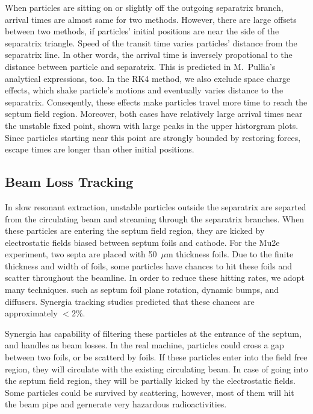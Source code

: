 \documentclass[aps,prstab,onecolumn,preprint,endfloats,11pt]{revtex4-1}
\begin{document}
When particles are sitting on or slightly off the outgoing separatrix branch, arrival times are almost same for two methods. However, there are large offsets between two methods, if particles' initial positions are near the side of the separatrix triangle. Speed of the transit time varies particles' distance from the separatrix line. In other words, the arrival time is inversely propotional to the distance between particle and separatrix. This is predicted in M.~Pullia's analytical expressions, too. In the RK4 method, we also exclude space charge effects, which shake particle's motions and eventually varies distance to the separatrix. Conseqently, these effects make particles travel more time to reach the septum field region. Moreover, both cases have relatively large arrival times near the unstable fixed point, shown with large peaks in the upper historgram plots. Since particles starting near this point are strongly bounded by restoring forces, escape times are longer than other initial positions. 



\clearpage
\subsection{\label{sec:beamloss}Beam Loss Tracking}

In slow resonant extraction, unstable particles outside the separatrix are separted from the circulating beam and streaming through the separatrix branches. When these particles are entering the septum field region, they are kicked by electrostatic fields biased between septum foils and cathode. For the Mu2e experiment, two septa are placed with 50~$\mu$m thickness foils. Due to the finite thickness and width of foils, some particles have chances to hit these foils and scatter throughout the beamline. In order to reduce these hitting rates, we adopt many techniques. such as septum foil plane rotation, dynamic bumps, and diffusers. Synergia tracking studies predicted that these chances are approximately $< 2 \%$. 

Synergia has capability of filtering these particles at the entrance of the septum, and handles as beam losses. In the real machine, particles could cross a gap between two foils, or be scatterd by foils. If these particles enter into the field free region, they will circulate with the existing circulating beam. In case of going into the septum field region, they will be partially kicked by the electrostatic fields. Some particles could be survived by scattering, however, most of them will hit the beam pipe and gernerate very hazardous radioactivities.
\end{document}
